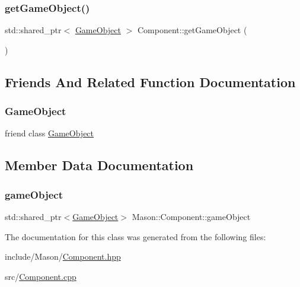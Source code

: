 \subsubsection{\texorpdfstring{get\+Game\+Object()}{getGameObject()}}
{\footnotesize\ttfamily std\+::shared\+\_\+ptr$<$ \hyperlink{class_mason_1_1_game_object}{Game\+Object} $>$ Component\+::get\+Game\+Object (\begin{DoxyParamCaption}{ }\end{DoxyParamCaption})}



\subsection{Friends And Related Function Documentation}
\hypertarget{class_mason_1_1_component_a00df87c957d8f7ee0fc51f07a0542f4a}{}\label{class_mason_1_1_component_a00df87c957d8f7ee0fc51f07a0542f4a} 
\subsubsection{\texorpdfstring{Game\+Object}{GameObject}}
{\footnotesize\ttfamily friend class \hyperlink{class_mason_1_1_game_object}{Game\+Object}\hspace{0.3cm}{\ttfamily [friend]}}



\subsection{Member Data Documentation}
\hypertarget{class_mason_1_1_component_abaa67b569d0a70e26a4606f4a099a925}{}\label{class_mason_1_1_component_abaa67b569d0a70e26a4606f4a099a925} 
\subsubsection{\texorpdfstring{game\+Object}{gameObject}}
{\footnotesize\ttfamily std\+::shared\+\_\+ptr$<$\hyperlink{class_mason_1_1_game_object}{Game\+Object}$>$ Mason\+::\+Component\+::game\+Object\hspace{0.3cm}{\ttfamily [protected]}}



The documentation for this class was generated from the following files\+:\begin{DoxyCompactItemize}
\item 
include/\+Mason/\hyperlink{_component_8hpp}{Component.\+hpp}\item 
src/\hyperlink{_component_8cpp}{Component.\+cpp}\end{DoxyCompactItemize}
